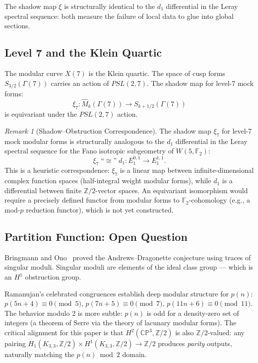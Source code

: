 \documentclass[11pt,a4paper]{article}
\theoremstyle{remark}
\newtheorem{remark}[theorem]{Remark}
\newcommand{\CP}{\mathbb{CP}}
\newcommand{\Z}{\mathbb{Z}}
\newcommand{\F}{\mathbb{F}}
\begin{document}
The shadow map $\xi$ is structurally identical to the $d_1$ differential
in the Leray spectral sequence: both measure the failure of local data
to glue into global sections.

\subsection{Level 7 and the Klein Quartic}

The modular curve $X(7)$ is the Klein quartic. The space of cusp forms
$S_{3/2}(\Gamma(7))$ carries an action of $PSL(2, 7)$. The shadow map
for level-7 mock forms:
\[
\xi_7: \widehat{M}_k(\Gamma(7)) \longrightarrow S_{k+1/2}(\Gamma(7))
\]
is equivariant under the $PSL(2, 7)$ action.

\begin{remark}[Shadow--Obstruction Correspondence]
\label{rem:shadow-obstruction}
The shadow map $\xi_7$ for level-7 mock modular forms is structurally
analogous to the $d_1$ differential in the Leray spectral sequence for
the Fano isotropic subgeometry of $W(5, \F_2)$:
\[
\xi_7 \;\text{``}\cong\text{''}\; d_1: E_1^{0,1} \longrightarrow E_1^{1,1}.
\]
This is a heuristic correspondence: $\xi_7$ is a linear map between
infinite-dimensional complex function spaces (half-integral weight
modular forms), while $d_1$ is a differential between finite
$\Z/2$-vector spaces. An equivariant isomorphism would require a
precisely defined functor from modular forms to $\F_2$-cohomology
(e.g., a mod-$p$ reduction functor), which is not yet constructed.
\end{remark}

\subsection{Partition Function: Open Question}

Bringmann and Ono~\cite{BringmannOno2006} proved the Andrews--Dragonette conjecture using
traces of singular moduli. Singular moduli are elements of the ideal
class group --- which is an $H^1$ obstruction group.

Ramanujan's celebrated congruences establish deep modular structure for
$p(n)$: $p(5n+4) \equiv 0 \pmod 5$, $p(7n+5) \equiv 0 \pmod 7$,
$p(11n+6) \equiv 0 \pmod{11}$. The behavior modulo 2 is more subtle:
$p(n)$ is odd for a density-zero set of integers (a theorem of Serre
via the theory of lacunary modular forms). The critical alignment for
this paper is that $H^2(\CP^3, \Z/2)$ is also $\Z/2$-valued: any
pairing $H_1(K_{3,3}, \Z/2) \times H^1(K_{3,3}, \Z/2) \to \Z/2$
produces \emph{parity} outputs, naturally matching the $p(n) \bmod 2$
domain.
\end{document}
